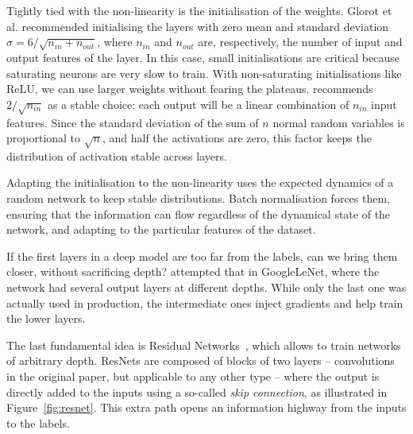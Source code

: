 Tightly tied  with the non-linearity is the initialisation of the weights.
Glorot et al. recommended initialising the layers with zero mean and standard deviation $\sigma=6/\sqrt{n_{in}+ n_{out}}$, where $n_{in}$ and $n_{out}$ are, respectively, the number of input and output features of the layer.
In this case, small initialisations are critical because saturating neurons are very slow to train.
With non-saturating initialisations like ReLU, we can use larger weights without fearing the plateaus.
\citet{he} recommends $2/\sqrt{n_{in}}$ as a stable choice: each output will be a linear combination of $n_{in}$ input features.
Since the standard deviation of the sum of $n$ normal random variables is proportional to $\sqrt{n}$, and half the activations are zero, this factor keeps the distribution of activation stable across layers.

Adapting the initialisation  to the non-linearity uses the expected dynamics of a random network to keep stable distributions.
Batch normalisation forces them, ensuring that the information can flow regardless of the dynamical state of the network, and adapting to the particular features of the dataset.

If the first layers  in a deep model are
too far from the labels, can we bring them closer, without sacrificing depth?
\citet{googlenet} attempted that in GoogleLeNet, where the network had several output layers at different depths.
While only the last one was actually used in production, the intermediate ones inject gradients and help train the lower layers.

The last fundamental idea  is Residual Networks~\citep{resnet}, which allows to train networks of arbitrary depth.
ResNets are composed of blocks of two layers  -- convolutions in the original paper, but applicable to any other type -- where the output is directly added to the inputs using a so-called \emph{skip connection}, as illustrated in Figure~\ref{fig:resnet}.
This extra path opens an information highway from the inputs to the labels.

